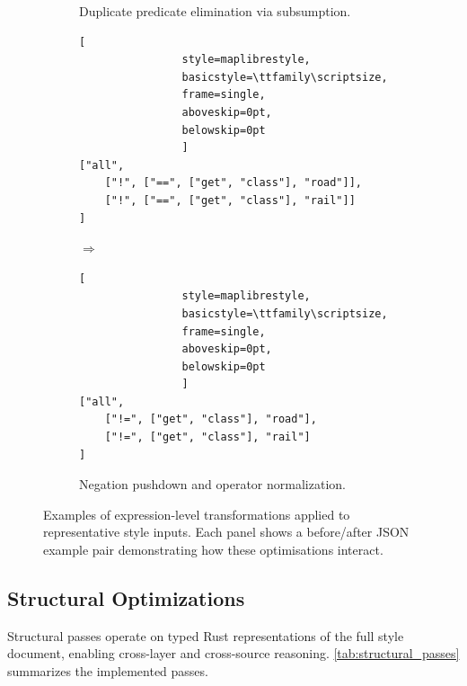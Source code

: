 \begin{figure}[ht]
\begin{subfigure}[t]{\linewidth}
		\caption{
Duplicate predicate elimination via subsumption.}
		\label{fig:expr_c}
	\end{subfigure}

	\vspace{4mm}

	\begin{subfigure}[t]{\linewidth}
		\centering

		\begin{minipage}[c]{0.42\linewidth}
			\centering
			\begin{lstlisting}[
				style=maplibrestyle,
				basicstyle=\ttfamily\scriptsize,
				frame=single,
				aboveskip=0pt,
				belowskip=0pt
				]
["all",
	["!", ["==", ["get", "class"], "road"]],
	["!", ["==", ["get", "class"], "rail"]]
]
			\end{lstlisting}
		\end{minipage}
		\hfill
		\begin{minipage}[c]{0.08\linewidth}
			\centering
			\vfill
			{\Huge$\Longrightarrow$}
			\vfill
		\end{minipage}
		\hfill
		\begin{minipage}[c]{0.42\linewidth}
			\centering
			\begin{lstlisting}[
				style=maplibrestyle,
				basicstyle=\ttfamily\scriptsize,
				frame=single,
				aboveskip=0pt,
				belowskip=0pt
				]
["all",
	["!=", ["get", "class"], "road"],
	["!=", ["get", "class"], "rail"]
]
			\end{lstlisting}
		\end{minipage}

		\caption{
Negation pushdown and operator normalization.}
		\label{fig:expr_d}
	\end{subfigure}

	\caption{
Examples of expression-level transformations applied to representative style inputs.
Each panel shows a before/after \ac{JSON} example pair demonstrating how these optimisations interact.}
	\label{fig:expr_before_after}
\end{figure}

\clearpage
\subsection{Structural Optimizations}\label{sub:structural_optimizations}

Structural passes operate on typed Rust representations of the full style document, enabling cross-layer and cross-source reasoning.
\cref{tab:structural_passes} summarizes the implemented passes.

